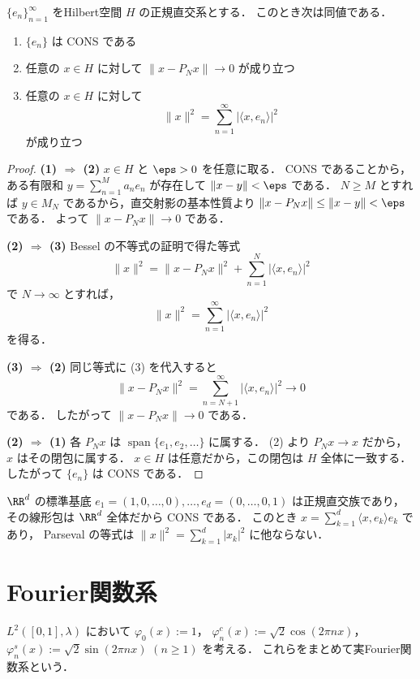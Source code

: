 \begin{theorem}[CONSの特徴づけ]
$\{e_n\}_{n=1}^{\infty}$ をHilbert空間 $H$ の正規直交系とする．
このとき次は同値である．
\begin{enumerate}
    \item $\{e_n\}$ は CONS である
    \item 任意の $x\in H$ に対して
    $\|x-P_Nx\|\to 0$ が成り立つ
    \item 任意の $x\in H$ に対して
    \[
    \|x\|^2=\sum_{n=1}^{\infty}|\langle x,e_n\rangle|^2
    \]
    が成り立つ
\end{enumerate}
\end{theorem}
\begin{proof}
\textbf{(1) $\Rightarrow$ (2)}\quad
$x\in H$ と $\eps>0$ を任意に取る．
CONS であることから，ある有限和
$y=\sum_{n=1}^M a_n e_n$ が存在して $\|x-y\|<\eps$ である．
$N\ge M$ とすれば $y\in M_N$ であるから，直交射影の基本性質より
$\|x-P_Nx\|\le \|x-y\|<\eps$ である．
よって $\|x-P_Nx\|\to 0$ である．

\textbf{(2) $\Rightarrow$ (3)}\quad
Bessel の不等式の証明で得た等式
\[
\|x\|^2=\|x-P_Nx\|^2+\sum_{n=1}^N |\langle x,e_n\rangle|^2
\]
で $N\to\infty$ とすれば，
\[
\|x\|^2=\sum_{n=1}^{\infty}|\langle x,e_n\rangle|^2
\]
を得る．

\textbf{(3) $\Rightarrow$ (2)}\quad
同じ等式に (3) を代入すると
\[
\|x-P_Nx\|^2
=
\sum_{n=N+1}^{\infty}|\langle x,e_n\rangle|^2
\to 0
\]
である．
したがって $\|x-P_Nx\|\to 0$ である．

\textbf{(2) $\Rightarrow$ (1)}\quad
各 $P_Nx$ は
$\operatorname{span}\{e_1,e_2,\dots\}$ に属する．
(2) より $P_Nx\to x$ だから，
$x$ はその閉包に属する．
$x\in H$ は任意だから，この閉包は $H$ 全体に一致する．
したがって $\{e_n\}$ は CONS である．
\end{proof}

\begin{example}
$\RR^d$ の標準基底
$e_1=(1,0,\dots,0),\dots,e_d=(0,\dots,0,1)$ は正規直交族であり，
その線形包は $\RR^d$ 全体だから CONS である．
このとき
$x=\sum_{k=1}^d \langle x,e_k\rangle e_k$ であり，
Parseval の等式は
$\|x\|^2=\sum_{k=1}^d |x_k|^2$ に他ならない．
\end{example}

\section{Fourier関数系}

\begin{definition}[実Fourier関数系]
$L^2([0,1],\lambda)$ において
$\varphi_0(x):=1$，
$\varphi_n^c(x):=\sqrt{2}\cos(2\pi n x)$，
$\varphi_n^s(x):=\sqrt{2}\sin(2\pi n x)$ $(n\ge 1)$ を考える．
これらをまとめて実Fourier関数系という．
\end{definition}

